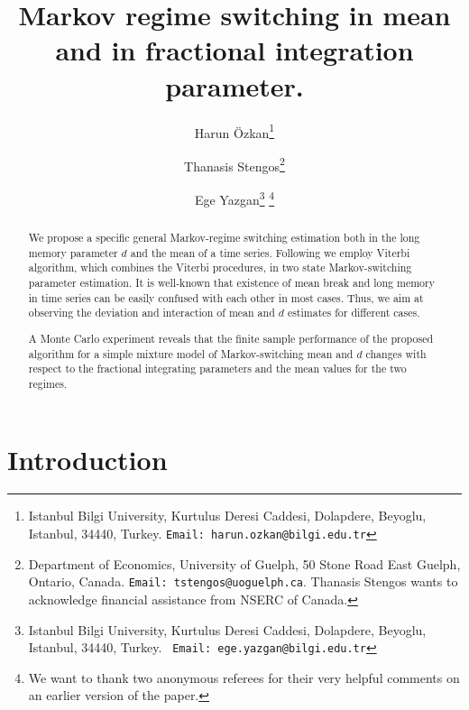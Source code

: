 \documentclass[11pt,fleqn]{article}
\renewcommand{\thesection}{\Roman{section}}
\renewcommand{\thesubsection}{\thesection-\Alph{subsection}}
\begin{document}
\title{Markov regime switching in mean and in fractional integration
parameter.}
\author{Harun Özkan\thanks{{\scriptsize Istanbul Bilgi University,
Kurtulus Deresi Caddesi, Dolapdere, Beyoglu, Istanbul, 34440, Turkey. 
\texttt{Email:~harun.ozkan@bilgi.edu.tr}}} \and Thanasis Stengos\thanks{
{\scriptsize Department of Economics, University of Guelph, 50 Stone Road
East Guelph, Ontario, Canada. \texttt{Email:~tstengos@uoguelph.ca}}. Thanasis Stengos wants to acknowledge financial assistance from NSERC of Canada. 
} \and 
Ege Yazgan\thanks{{\scriptsize Istanbul Bilgi University, Kurtulus Deresi
Caddesi, Dolapdere, Beyoglu, Istanbul, 34440, Turkey. \texttt{
Email:~ege.yazgan@bilgi.edu.tr}}} 
\thanks{{\scriptsize  We want to thank two anonymous referees for their very helpful comments on an earlier version of the paper.}} }
\maketitle

\begin{abstract}
We propose a specific general Markov-regime switching estimation both in the
long memory parameter $d $ and the mean of a time series. Following \cite%
{Tsay2009} we employ Viterbi algorithm, which combines the Viterbi
procedures, in two state Markov-switching parameter estimation. It is
well-known that existence of mean break and long memory in time series can
be easily confused with each other in most cases. Thus, we aim at observing
the deviation and interaction of mean and $d $ estimates for different cases.

A Monte Carlo experiment reveals that the finite sample performance of the
proposed algorithm for a simple mixture model of Markov-switching mean and $%
d $ changes with respect to the fractional integrating parameters and the
mean values for the two regimes.

\end{abstract}

\clearpage
\setcounter{page}{0} \thispagestyle{empty}

\renewcommand{\thesection}{\arabic{section}.} \renewcommand{\thesubsection}{%
\arabic{section}.\arabic{subsection}.} \newpage

\section{ Introduction}
\end{document}
